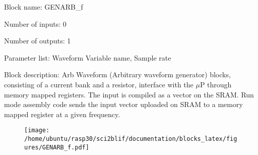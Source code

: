 \pagebreak

Block name: GENARB\_f

Number of inputs: 0

Number of outputs: 1

Parameter list: Waveform Variable name, Sample rate

Block description: 
Arb Waveform (Arbitrary waveform generator) blocks, consisting of a current bank and a resistor, interface with the $\mu$P through memory mapped registers. The input is compiled as a vector on the SRAM. Run mode assembly code sends the input vector uploaded on SRAM to a memory mapped register at a given frequency.

\begin{figure}[H]  %
\texttt{[image: /home/ubuntu/rasp30/sci2blif/documentation/blocks\_latex/figures/GENARB\_f.pdf]}
\end{figure}

